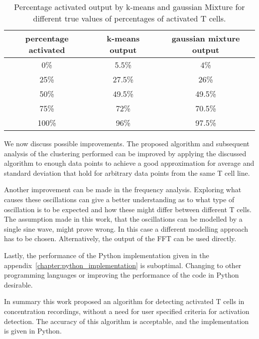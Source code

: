 \begin{table}[h]
	\centering
	\begin{tabular}{|c|c|c|}
		\hline
		\textbf{percentage activated} & \textbf{k-means output} & \textbf{gaussian mixture output}\\
		\hline
		\hline
		0\% & 5.5\% & 4\%\\
		\hline
		25\% & 27.5\% & 26\%\\
		\hline
		50\% & 49.5\% & 49.5\%\\
		\hline
		75\% & 72\% & 70.5\%\\
		\hline
		100\% & 96\% & 97.5\%\\
		\hline
	\end{tabular}
	\caption{Percentage activated output by k-means and gaussian Mixture for different true values of percentages of activated T cells.}
	\label{tab:accuracy}
\end{table}

We now discuss possible improvements. The proposed algorithm and subsequent analysis of the clustering performed can be improved by applying the discussed algorithm to enough data points to achieve a good approximation for average and standard deviation that hold for arbitrary data points from the same T cell line.

Another improvement can be made in the frequency analysis. Exploring what causes these oscillations can give a better understanding as to what type of oscillation is to be expected and how these might differ between different T cells. The assumption made in this work, that the oscillations can be modelled by a single sine wave, might prove wrong. In this case a different modelling approach has to be chosen. Alternatively, the output of the FFT can be used directly.

Lastly, the performance of the Python implementation given in the appendix~\ref{chapter:python_implementation} is suboptimal. Changing to other programming languages or improving the performance of the code in Python desirable.

\vspace{0.5cm}
\noindent
In summary this work proposed an algorithm for detecting activated T cells in \Calcium concentration recordings, without a need for user specified criteria for activation detection. The accuracy of this algorithm is acceptable, and the implementation is given in Python.